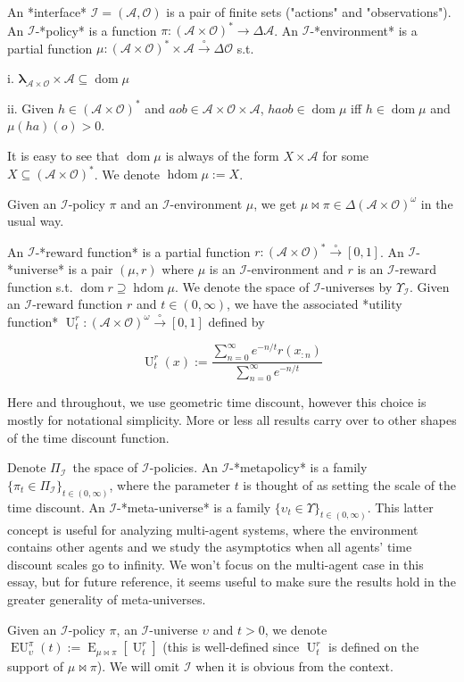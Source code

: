 \documentclass[a4paper]{article}
\DeclareMathOperator{\Dom}{dom}
\newcommand{\E}{\operatorname{E}}
\newcommand{\Estr}{\boldsymbol{\lambda}}
\newcommand{\PF}{\xrightarrow{\circ}}
\newcommand{\Ob}{\mathcal{O}}
\newcommand{\A}{\mathcal{A}}
\newcommand{\I}{\mathcal{I}}
\newcommand{\FH}{(\A \times \Ob)^*}
\newcommand{\IH}{(\A \times \Ob)^\omega}
\DeclareMathOperator{\HD}{hdom}
\newcommand{\Ut}{\operatorname{U}}
\newcommand{\EU}{\operatorname{EU}}
\begin{document}
An *interface* $\I = (\A,\Ob)$ is a pair of finite sets  ("actions" and "observations"). An $\I$-*policy* is a function $\pi: \FH \rightarrow \Delta\A$. An $\I$-*environment* is a partial function $\mu: \FH \times \A \PF \Delta\Ob$ s.t. 

i. $\Estr_{\A \times \Ob} \times \A \subseteq \Dom \mu$

ii. Given $h \in \FH$ and $aob \in \A \times \Ob \times \A$, $haob \in \Dom \mu$ iff $h \in \Dom \mu$ and $\mu(ha)(o) > 0$.

It is easy to see that $\Dom \mu$ is always of the form $X \times \A$ for some $X \subseteq \FH$. We denote $\HD \mu := X$.

Given an $\I$-policy $\pi$ and an $\I$-environment $\mu$, we get $\mu\bowtie\pi \in \Delta\IH$ in the usual way.

An $\I$-*reward function* is a partial function $r: (\A \times \Ob)^* \PF [0,1]$. An $\I$-*universe* is a pair $(\mu,r)$ where $\mu$ is an $\I$-environment and $r$ is an $\I$-reward function s.t. $\Dom{r} \supseteq \HD{\mu}$. We denote the space of $\I$-universes by $\Upsilon_\I$. Given an $\I$-reward function $r$ and $t \in (0,\infty)$, we have the associated *utility function* $\Ut_t^r: \IH \PF [0,1]$ defined by

$$\Ut_t^{r}(x):=\frac{\sum_{n=0}^\infty e^{-n/t} r(x_{:n})}{\sum_{n=0}^\infty e^{-n/t}}$$

Here and throughout, we use geometric time discount, however this choice is mostly for notational simplicity. More or less all results carry over to other shapes of the time discount function.

Denote $\Pi_{\I}$\ the space of $\I$-policies. An $\I$-*metapolicy* is a family $\{\pi_t \in \Pi_\I\}_{t \in (0, \infty)}$, where the parameter $t$ is thought of as setting the scale of the time discount. An $\I$-*meta-universe* is a family $\{\upsilon_t \in \Upsilon\}_{t \in (0, \infty)}$. This latter concept is useful for analyzing multi-agent systems, where the environment contains other agents and we study the asymptotics when all agents' time discount scales go to infinity. We won't focus on the multi-agent case in this essay, but for future reference, it seems useful to make sure the results hold in the greater generality of meta-universes.

Given an $\I$-policy $\pi$, an $\I$-universe $\upsilon$ and $t > 0$, we denote $\EU_\upsilon^\pi(t):=\E_{\mu\bowtie\pi}[\Ut^r_t]$ (this is well-defined since $\Ut^r_t$ is defined on the support of $\mu\bowtie\pi$). We will omit $\I$ when it is obvious from the context.
\end{document}
